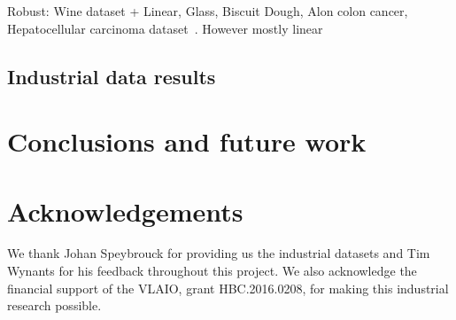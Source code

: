 \documentclass[preprint,12pt]{elsarticle}
\begin{document}
Robust: Wine dataset + Linear, Glass, Biscuit Dough, Alon colon cancer, Hepatocellular carcinoma dataset~\cite{debruyne2009robustified}. However mostly linear

\subsection{Industrial data results} 

\section{Conclusions and future work}

\section*{Acknowledgements}

We thank Johan Speybrouck for providing us the industrial datasets and Tim Wynants for his feedback throughout this project. We also acknowledge the financial support of the VLAIO, grant HBC.2016.0208, for making this industrial research possible.





%





%
%
%
\end{document}
